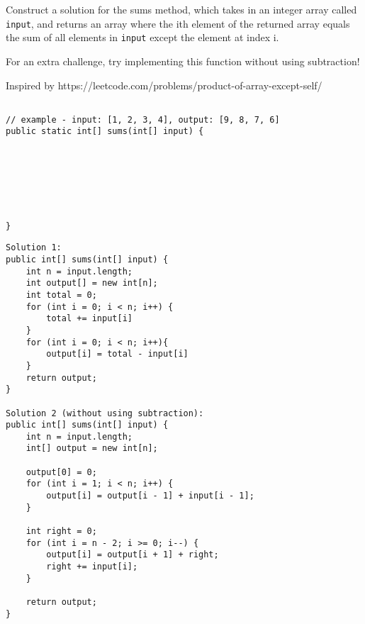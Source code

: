 \begin{blocksection}

\question Construct a solution for the sums method, which takes in an integer array called \lstinline$input$, and returns an array where the ith element of the returned array equals the sum of all elements in \lstinline$input$ except the element at index i. 

For an extra challenge, try implementing this function without using subtraction!

Inspired by https://leetcode.com/problems/product-of-array-except-self/

\ifprintanswers\else
\begin{lstlisting}

// example - input: [1, 2, 3, 4], output: [9, 8, 7, 6]
public static int[] sums(int[] input) {







}
\end{lstlisting}
\fi

\begin{solution}
\begin{lstlisting}
Solution 1:
public int[] sums(int[] input) {
    int n = input.length;
    int output[] = new int[n];
    int total = 0;
    for (int i = 0; i < n; i++) {
        total += input[i]
    }
    for (int i = 0; i < n; i++){
        output[i] = total - input[i]
    }
    return output;
}

Solution 2 (without using subtraction):
public int[] sums(int[] input) {
    int n = input.length;
    int[] output = new int[n];
    
    output[0] = 0;
    for (int i = 1; i < n; i++) {
        output[i] = output[i - 1] + input[i - 1];
    }
    
    int right = 0;
    for (int i = n - 2; i >= 0; i--) {
        output[i] = output[i + 1] + right;
        right += input[i];
    }

    return output;
}

\end{lstlisting}
\end{solution}

\end{blocksection}
